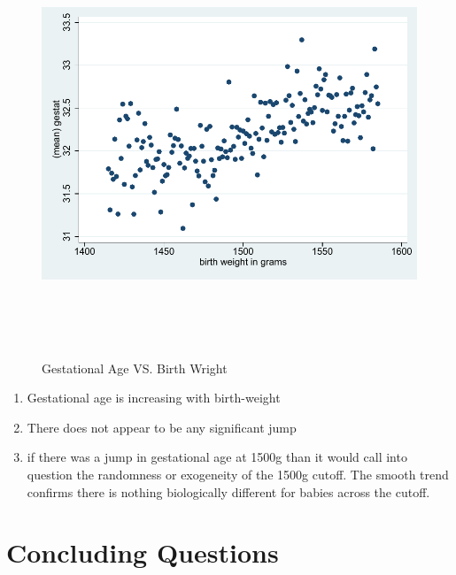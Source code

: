 \documentclass[11pt]{article}
\begin{document}
\begin{figure}[H]
	\caption{Gestational Age VS. Birth Wright}\label{fig1}
	\begin{center}
		\includegraphics[height=5in,angle=0]{my_ps1_graph.pdf}
	\end{center}
\end{figure}

\begin{enumerate}
	\item Gestational age is increasing with birth-weight
	\item There does not appear to be any significant jump 
	\item if there was a jump in gestational age at 1500g than it would call into question the randomness or exogeneity of the 1500g cutoff. The smooth trend confirms there is nothing biologically different for babies across the cutoff. 
\end{enumerate}

\section{Concluding Questions}
\end{document}
